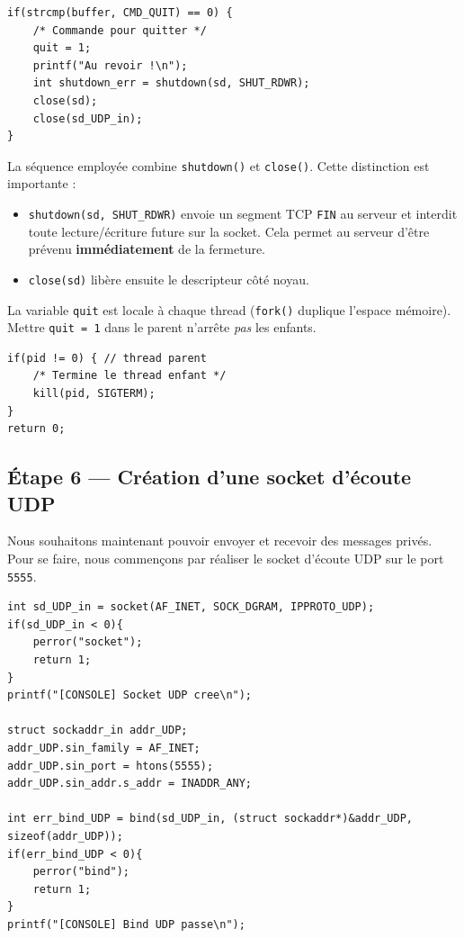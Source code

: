 \documentclass[a4paper,12pt,french]{article}
\begin{document}
\begin{verbatim}
if(strcmp(buffer, CMD_QUIT) == 0) {
    /* Commande pour quitter */
    quit = 1;
    printf("Au revoir !\n");
    int shutdown_err = shutdown(sd, SHUT_RDWR);
    close(sd);
    close(sd_UDP_in);
}
\end{verbatim}

La séquence employée combine \texttt{shutdown()} et \texttt{close()}. Cette distinction est
importante :
\begin{itemize}
    \item \texttt{shutdown(sd, SHUT\_RDWR)} envoie un segment TCP \texttt{FIN} au serveur
    et interdit toute lecture/écriture future sur la socket.
    Cela permet au serveur d'être prévenu \textbf{immédiatement} de la fermeture.
    \item \texttt{close(sd)} libère ensuite le descripteur côté noyau.
\end{itemize}

La variable \texttt{quit} est locale à chaque thread (\texttt{fork()} duplique l'espace mémoire). Mettre \texttt{quit = 1} dans le parent n'arrête \emph{pas} les enfants.

\begin{verbatim}
if(pid != 0) { // thread parent
    /* Termine le thread enfant */
    kill(pid, SIGTERM);
}
return 0;
\end{verbatim}

\pagebreak
\subsection{Étape 6 — Création d'une socket d'écoute UDP}

Nous souhaitons maintenant pouvoir envoyer et recevoir des messages privés. Pour se faire, nous commençons par réaliser le socket d'écoute UDP sur le port \texttt{5555}.

\begin{verbatim}
int sd_UDP_in = socket(AF_INET, SOCK_DGRAM, IPPROTO_UDP);
if(sd_UDP_in < 0){
    perror("socket");
    return 1;
}
printf("[CONSOLE] Socket UDP cree\n");

struct sockaddr_in addr_UDP;
addr_UDP.sin_family = AF_INET;
addr_UDP.sin_port = htons(5555);
addr_UDP.sin_addr.s_addr = INADDR_ANY;

int err_bind_UDP = bind(sd_UDP_in, (struct sockaddr*)&addr_UDP, sizeof(addr_UDP));
if(err_bind_UDP < 0){
    perror("bind");
    return 1;
}
printf("[CONSOLE] Bind UDP passe\n");
\end{verbatim}
\end{document}
